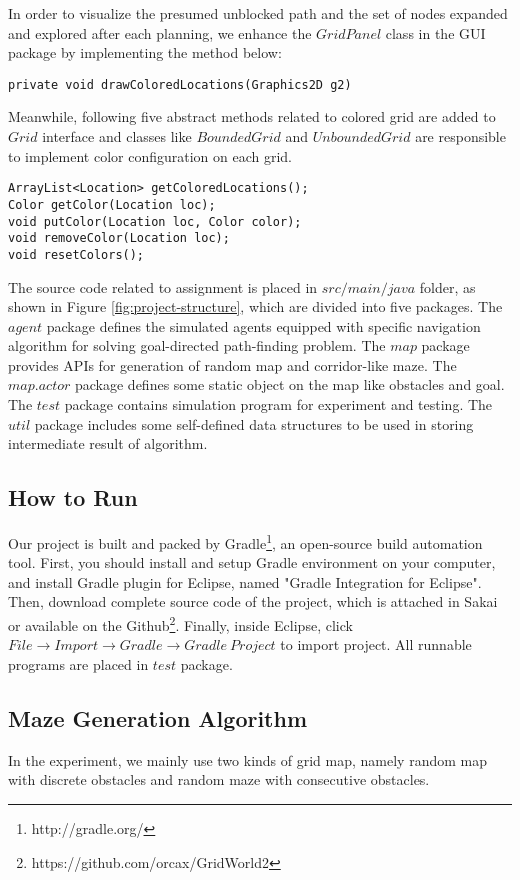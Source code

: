 In order to visualize the presumed unblocked path and the set of nodes expanded
and explored after each planning, we enhance the $GridPanel$ class in the 
GUI package by implementing the method below:

\begin{lstlisting}
private void drawColoredLocations(Graphics2D g2)
\end{lstlisting}

Meanwhile, following five abstract methods related to colored grid are added 
to $Grid$ interface and classes like $BoundedGrid$ and $UnboundedGrid$ are 
responsible to implement color configuration on each grid.

\begin{lstlisting}
ArrayList<Location> getColoredLocations();
Color getColor(Location loc);
void putColor(Location loc, Color color);
void removeColor(Location loc);
void resetColors();
\end{lstlisting}

The source code related to assignment is placed in $src/main/java$ folder, as 
shown in Figure \ref{fig:project-structure}, which are divided into five packages.
The $agent$ package defines the simulated agents equipped with specific navigation 
algorithm for solving goal-directed path-finding problem. The $map$ package 
provides APIs for generation of random map and corridor-like maze. The $map.actor$ 
package defines some static object on the map like obstacles and goal. The $test$
package contains simulation program for experiment and testing. The $util$
package includes some self-defined data structures to be used in storing 
intermediate result of algorithm.

\subsection{How to Run}

Our project is built and packed by Gradle\footnote{http://gradle.org/}, 
an open-source build automation tool. First, you should install and setup Gradle
environment on your computer, and install Gradle plugin for Eclipse, named 
"Gradle Integration for Eclipse". Then, download complete source code of the 
project, which is attached in Sakai or available on the 
Github\footnote{https://github.com/orcax/GridWorld2}. Finally, inside Eclipse,
click $File\rightarrow Import\rightarrow Gradle\rightarrow Gradle~Project$ to
import project. All runnable programs are placed in $test$ package.

\subsection{Maze Generation Algorithm}

In the experiment, we mainly use two kinds of grid map, namely random map with 
discrete obstacles and random maze with consecutive obstacles.
